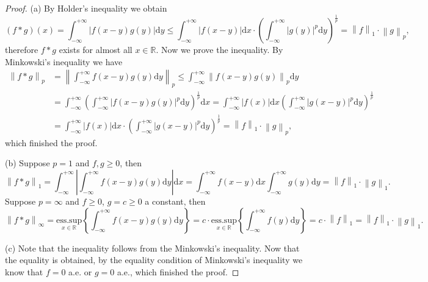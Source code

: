 \begin{proof}
(a) By Holder's inequality we obtain 
$$
\left( f*g \right) \left( x \right) =\int_{-\infty}^{+\infty}{\left| f\left( x-y \right) g\left( y \right) \right|\mathrm{d}y}\le \int_{-\infty}^{+\infty}{\left| f\left( x-y \right) \right|\mathrm{d}x}\cdot \left( \int_{-\infty}^{+\infty}{\left| g\left( y \right) \right|^p\mathrm{d}y} \right) ^{\frac{1}{p}}=\left\| f \right\| _1\cdot \left\| g \right\| _p,
$$
therefore $f*g$ exists for almost all $x\in\mathbb{R}$. Now we prove the inequality. By Minkowski's inequality we have 
$$
\begin{aligned}
\left\| f*g \right\| _p&=\left\| \int_{-\infty}^{+\infty}{f\left( x-y \right) g\left( y \right) \mathrm{d}y} \right\| _p\le \int_{-\infty}^{+\infty}{\left\| f\left( x-y \right) g\left( y \right) \right\| _p\mathrm{d}y}
\\
&=\int_{-\infty}^{+\infty}{\left( \int_{-\infty}^{+\infty}{\left| f\left( x-y \right) g\left( y \right) \right|^p\mathrm{d}y} \right) ^{\frac{1}{p}}\mathrm{d}x}=\int_{-\infty}^{+\infty}{\left| f\left( x \right) \right|\mathrm{d}x\left( \int_{-\infty}^{+\infty}{\left| g\left( x-y \right) \right|^p\mathrm{d}y} \right) ^{\frac{1}{p}}}
\\
&=\int_{-\infty}^{+\infty}{\left| f\left( x \right) \right|\mathrm{d}x}\cdot \left( \int_{-\infty}^{+\infty}{\left| g\left( x-y \right) \right|^p\mathrm{d}y} \right) ^{\frac{1}{p}}=\left\| f \right\| _1\cdot \left\| g \right\| _p,
\end{aligned}
$$
which finished the proof.\par
(b) Suppose $p=1$ and $f,g\ge 0$, then 
$$
\left\| f*g \right\| _1=\int_{-\infty}^{+\infty}{\left| \int_{-\infty}^{+\infty}{f\left( x-y \right) g\left( y \right) \mathrm{d}y} \right|\mathrm{d}x}=\int_{-\infty}^{+\infty}{f\left( x-y \right) \mathrm{d}x\int_{-\infty}^{+\infty}{g\left( y \right) \mathrm{d}y}}=\left\| f \right\| _1\cdot \left\| g \right\| _1.
$$
Suppose $p=\infty$ and $f\ge 0$, $g=c\ge 0$ a constant, then 
$$
\left\| f*g \right\| _{\infty}=\underset{x\in \mathbb{R}}{\mathrm{ess}.\mathrm{sup}}\left\{ \int_{-\infty}^{+\infty}{f\left( x-y \right) g\left( y \right) \mathrm{d}y} \right\} =c\cdot \underset{x\in \mathbb{R}}{\mathrm{ess}.\mathrm{sup}}\left\{ \int_{-\infty}^{+\infty}{f\left( y \right) \mathrm{d}y} \right\} =c\cdot \left\| f \right\| _1=\left\| f \right\| _1\cdot \left\| g \right\| _1.
$$\par
(c) Note that the inequality follows from the Minkowski's inequality. Now that the equality is obtained, by the equality condition of Minkowski's inequality we know that $f=0$ a.e. or $g=0$ a.e., which finished the proof.\par

\end{proof}
